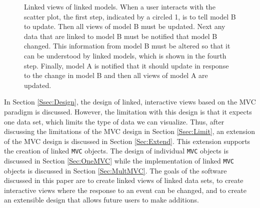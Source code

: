 \documentclass{article}[11pt]
\newcommand{\Robject}[1]{{\texttt{#1}}}
\begin{document}
\begin{figure}[ht]
  \begin{center}
    \caption{ Linked views of linked models.  When a user interacts with
      the scatter plot, the first step, indicated by a circled 1,
      is to tell model B to update.  Then all views of model B must be
      updated.  Next any data that are linked to model B must be notified
      that model B changed.  This information from model B must be
      altered so that it can be understood by linked models, which is shown
      in the fourth step.  Finally, model A is notified that it should
      update in response to the change in model B and then all views of
      model A are updated. }
    \label{Fig:firstMP}
  \end{center}
\end{figure}

In Section \ref{Ssec:Design}, the design of linked, interactive views based on
the MVC paradigm is discussed.  However, the limitation with this design is
that it expects one data set, which limits the type of data we can visualize.
Thus, after discussing the limitations of
the MVC design in Section \ref{Ssec:Limit}, an extension of the MVC design is
discussed in Section \ref{Sec:Extend}.  This extension supports the creation of
linked \Robject{MVC} objects.  The design of individual \Robject{MVC} objects
is discussed in Section \ref{Sec:OneMVC} while the implementation of linked
\Robject{MVC} objects is discussed in Section \ref{Sec:MultMVC}.  The goals of
the software discussed in this paper are to create linked views of linked data
sets, to create interactive views where the response to an event can be
changed, and to create an extensible design that allows future users to make
additions. 
\end{document}
